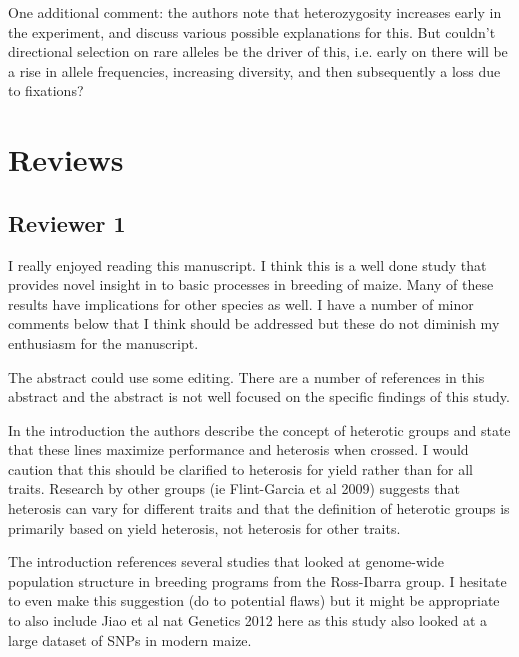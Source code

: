 \documentclass[onecolumn,oneside,letterpaper]{article}
\begin{document}

One additional comment: the authors note that heterozygosity increases early in the experiment, and discuss various possible explanations for this. But couldn't directional selection on rare alleles be the driver of this, i.e. early on there will be a rise in allele frequencies, increasing diversity, and then subsequently a loss due to fixations?


\section*{Reviews}
\subsection*{Reviewer 1}
I really enjoyed reading this manuscript.  I think this is a well done study 
that provides novel insight in to basic processes in breeding of maize.  Many of 
these results have implications for other species as well.  I have a number of 
minor comments below that I think should be addressed but these do not diminish 
my enthusiasm for the manuscript.

The abstract could use some editing.  There are a number of references in this 
abstract and the abstract is not well focused on the specific findings of this 
study.  


In the introduction the authors describe the concept of heterotic groups and state that these lines maximize performance and heterosis when crossed.  I would caution that this should be clarified to heterosis for yield rather than for all traits. Research by other groups (ie Flint-Garcia et al 2009) suggests that heterosis can vary for different traits and that the definition of heterotic groups is primarily based on yield heterosis, not heterosis for other traits.  


The introduction references several studies that looked at genome-wide 
population structure in breeding programs from the Ross-Ibarra group.  I 
hesitate to even make this suggestion (do to potential flaws) but it might be appropriate to also include Jiao et al nat Genetics 2012 here as this study also looked at a large dataset of SNPs in modern maize. 

\end{document}
